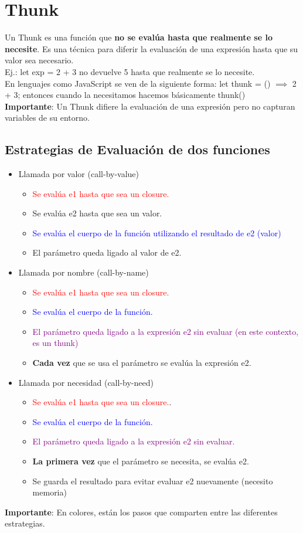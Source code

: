 \documentclass[10pt,a4paper]{article}
\begin{document}
\section*{Thunk}
Un Thunk es una función que \textbf{no se evalúa hasta que realmente se lo necesite}. Es una técnica para diferir la evaluación de una expresión hasta que su valor sea necesario. \\
Ej.: let exp = 2 + 3 no devuelve 5 hasta que realmente se lo necesite. \\
En lenguajes como JavaScript se ven de la siguiente forma: let thunk = () $\implies$ 2 + 3; entonces cuando la necesitamos hacemos básicamente thunk() \\
\textbf{Importante}: Un Thunk difiere la evaluación de una expresión pero no capturan variables de su entorno. 
\subsection*{Estrategias de Evaluación de dos funciones}
\begin{itemize}
    \item Llamada por valor (call-by-value)
    \begin{itemize}
        \item \textcolor{red}{Se evalúa e1 hasta que sea un closure.}
        \item Se evalúa e2 hasta que sea un valor.
        \item \textcolor{blue}{Se evalúa el cuerpo de la función utilizando el resultado de e2 (valor)}
        \item El parámetro queda ligado al valor de e2.
    \end{itemize}
    \item Llamada por nombre (call-by-name)
    \begin{itemize}
        \item \textcolor{red}{Se evalúa e1 hasta que sea un closure.}
        \item \textcolor{blue}{Se evalúa el cuerpo de la función.}
        \item \textcolor{purple}{El parámetro queda ligado a la expresión e2 sin evaluar (en este contexto, es un thunk)}
        \item \textbf{Cada vez} que se usa el parámetro se evalúa la expresión e2.
    \end{itemize}
    \item Llamada por necesidad (call-by-need)
    \begin{itemize}
        \item \textcolor{red}{Se evalúa e1 hasta que sea un closure.}.
        \item \textcolor{blue}{Se evalúa el cuerpo de la función.}
        \item \textcolor{purple}{El parámetro queda ligado a la expresión e2 sin evaluar.}
        \item \textbf{La primera vez} que el parámetro se necesita, se evalúa e2.
        \item Se guarda el resultado para evitar evaluar e2 nuevamente (necesito memoria)
    \end{itemize}
\end{itemize}
\textbf{Importante}: En colores, están los pasos que comparten entre las diferentes estrategias.
\end{document}
